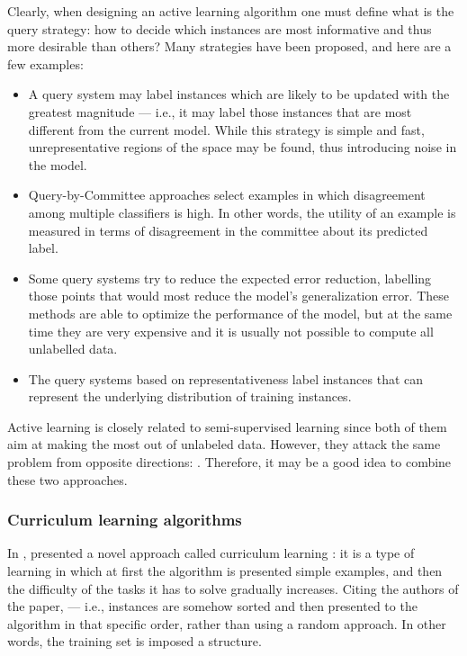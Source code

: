                 Clearly, when designing an active learning algorithm one must define what is the query strategy: how to decide which instances are most informative and thus more desirable than others? Many strategies have been proposed, and here are a few examples:
                \begin{itemize}
                    \item A query system may label instances which are likely to be updated with the greatest magnitude --- i.e., it may label those instances that are most different from the current model. While this strategy is simple and fast, unrepresentative regions of the space may be found, thus introducing noise in the model.
                    \item Query-by-Committee approaches select examples in which disagreement among multiple classifiers is high. In other words, the utility of an example is measured in terms of disagreement in the committee about its predicted label.
                    \item Some query systems try to reduce the expected error reduction, labelling those points that would most reduce the model's generalization error. These methods are able to optimize the performance of the model, but at the same time they are very expensive and it is usually not possible to compute all unlabelled data.
                    \item The query systems based on representativeness label instances that can represent the underlying distribution of training instances.
                \end{itemize}
                
                Active learning is closely related to semi-supervised learning since both of them aim at making the most out of unlabeled data. However, they attack the same problem from opposite directions:  \cite[45]{Settles}. Therefore, it may be a good idea to combine these two approaches.
            \subsubsection{Curriculum learning algorithms}\label{cv_learning}
                In \citeyear{Bengio}, \citeauthor{Bengio} presented a novel approach called curriculum learning \cite{Bengio}: it is a type of learning in which at first the algorithm is presented simple examples, and then the difficulty of the tasks it has to solve gradually increases. Citing the authors of the paper,  --- i.e., instances are somehow sorted and then presented to the algorithm in that specific order, rather than using a random approach. In other words, the training set is imposed a structure.
                
